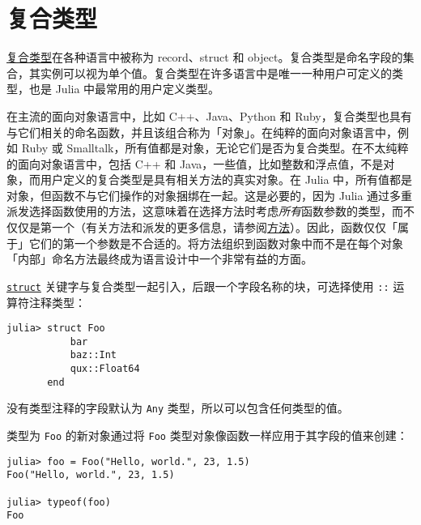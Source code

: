 \hypertarget{805665046800217201}{}


\section{复合类型}



\href{https://en.wikipedia.org/wiki/Composite\_data\_type}{复合类型}在各种语言中被称为 record、struct 和 object。复合类型是命名字段的集合，其实例可以视为单个值。复合类型在许多语言中是唯一一种用户可定义的类型，也是 Julia 中最常用的用户定义类型。



在主流的面向对象语言中，比如 C++、Java、Python 和 Ruby，复合类型也具有与它们相关的命名函数，并且该组合称为「对象」。在纯粹的面向对象语言中，例如 Ruby 或 Smalltalk，所有值都是对象，无论它们是否为复合类型。在不太纯粹的面向对象语言中，包括 C++ 和 Java，一些值，比如整数和浮点值，不是对象，而用户定义的复合类型是具有相关方法的真实对象。在 Julia 中，所有值都是对象，但函数不与它们操作的对象捆绑在一起。这是必要的，因为 Julia 通过多重派发选择函数使用的方法，这意味着在选择方法时考虑\emph{所有}函数参数的类型，而不仅仅是第一个（有关方法和派发的更多信息，请参阅\hyperlink{3842379394166369470}{方法}）。因此，函数仅仅「属于」它们的第一个参数是不合适的。将方法组织到函数对象中而不是在每个对象「内部」命名方法最终成为语言设计中一个非常有益的方面。



\hyperlink{4119979838407461137}{\texttt{struct}} 关键字与复合类型一起引入，后跟一个字段名称的块，可选择使用 \texttt{::} 运算符注释类型：




\begin{verbatim}
julia> struct Foo
           bar
           baz::Int
           qux::Float64
       end
\end{verbatim}



没有类型注释的字段默认为 \texttt{Any} 类型，所以可以包含任何类型的值。



类型为 \texttt{Foo} 的新对象通过将 \texttt{Foo} 类型对象像函数一样应用于其字段的值来创建：




\begin{verbatim}
julia> foo = Foo("Hello, world.", 23, 1.5)
Foo("Hello, world.", 23, 1.5)

julia> typeof(foo)
Foo
\end{verbatim}



